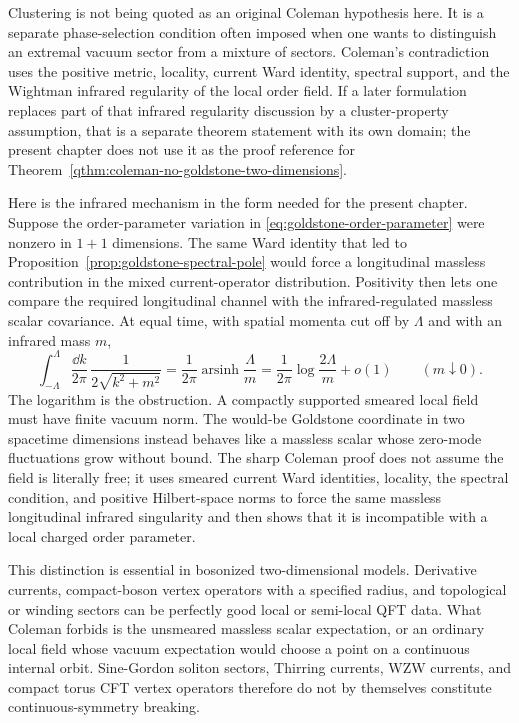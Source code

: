 Clustering is not being quoted as an original Coleman hypothesis here.  It is
a separate phase-selection condition often imposed when one wants to distinguish
an extremal vacuum sector from a mixture of sectors.  Coleman's contradiction
uses the positive metric, locality, current Ward identity, spectral support,
and the Wightman infrared regularity of the local order field.  If a later
formulation replaces part of that infrared regularity discussion by a
cluster-property assumption, that is a separate theorem statement with its own
domain; the present chapter does not use it as the proof reference for
Theorem~\ref{qthm:coleman-no-goldstone-two-dimensions}.

Here is the infrared mechanism in the form needed for the present chapter.
Suppose the order-parameter variation in
\eqref{eq:goldstone-order-parameter} were nonzero in \(1+1\) dimensions.
The same Ward identity that led to
Proposition~\ref{prop:goldstone-spectral-pole} would force a longitudinal
massless contribution in the mixed current-operator distribution.  Positivity
then lets one compare the required longitudinal channel with the
infrared-regulated massless scalar covariance.  At equal time, with spatial
momenta cut off by \(\Lambda\) and with an infrared mass \(m\),
\begin{equation}
  \int_{-\Lambda}^{\Lambda}
  \frac{\dd k}{2\pi}\,
  \frac{1}{2\sqrt{k^2+m^2}}
  =
  \frac{1}{2\pi}\operatorname{arsinh}\frac{\Lambda}{m}
  =
  \frac{1}{2\pi}\log\frac{2\Lambda}{m}+o(1)
  \qquad(m\downarrow0).
  \label{eq:coleman-massless-scalar-log}
\end{equation}
The logarithm is the obstruction.  A compactly supported smeared local field
must have finite vacuum norm.  The would-be Goldstone coordinate in two
spacetime dimensions instead behaves like a massless scalar whose zero-mode
fluctuations grow without bound.  The sharp Coleman proof does not assume the
field is literally free; it uses smeared current Ward identities, locality,
the spectral condition, and positive Hilbert-space norms to force the same
massless longitudinal infrared singularity and then shows that it is
incompatible with a local charged order parameter.

This distinction is essential in bosonized two-dimensional models.  Derivative
currents, compact-boson vertex operators with a specified radius, and
topological or winding sectors can be perfectly good local or semi-local QFT
data.  What Coleman forbids is the unsmeared massless scalar expectation, or
an ordinary local field whose vacuum expectation would choose a point on a
continuous internal orbit.  Sine-Gordon soliton sectors, Thirring currents,
WZW currents, and compact torus CFT vertex operators therefore do not by
themselves constitute continuous-symmetry breaking.

